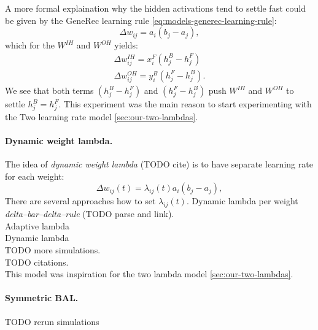 A more formal explaination why the hidden activations tend to settle fast could be given by the GeneRec learning rule \ref{eq:models-generec-learning-rule}: 
\begin{equation} 
  \Delta w_{ij} = a_i(b_j - a_j),
\end{equation} 
which for the $W^{IH}$ and $W^{OH}$ yields: 
\begin{align} 
  \Delta w_{ij}^{IH} = x^F_i(h^B_j - h^F_j) \\ 
  \Delta w_{ij}^{OH} = y^B_i(h^F_j - h^B_j). 
\end{align} 
We see that both terms $(h^B_j - h^F_j)$ and $(h^F_j - h^B_j)$ push $W^{IH}$ and $W^{OH}$ to settle $h^B_j = h^F_j$. This experiment was the main reason to start experimenting with the Two learning rate model \ref{sec:our-two-lambdas}. 

\paragraph{Dynamic weight lambda.} 
\label{sec:our-dynamic-lambda} 
The idea of \emph{dynamic weight lambda} (TODO cite) is to have separate learning rate for each weight: 
\begin{equation}
\Delta w_{ij}(t) = \lambda_{ij}(t) a_i\left(b_j - a_j\right), 
\end{equation}
There are several approaches how to set $\lambda_{ij}(t)$. Dynamic lambda per weight \emph{delta--bar--delta--rule} \citep{jacobs1988increased} (TODO parse and link). \\
Adaptive lambda \citep{riedmiller1993direct} \\
Dynamic lambda \citep{yu1997efficient} \\ 
TODO more simulations.  \\
TODO citations.  \\
This model was inspiration for the two lambda model \ref{sec:our-two-lambdas}. 

\paragraph{Symmetric BAL.}
TODO rerun simulations 


